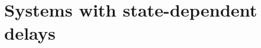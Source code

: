 \documentclass[11pt]{scrartcl}
\newcommand{\R}{\mathbb{R}}
\begin{document}
\section{Systems with state-dependent delays}
\label{sec:sd-dde}
\end{document}
